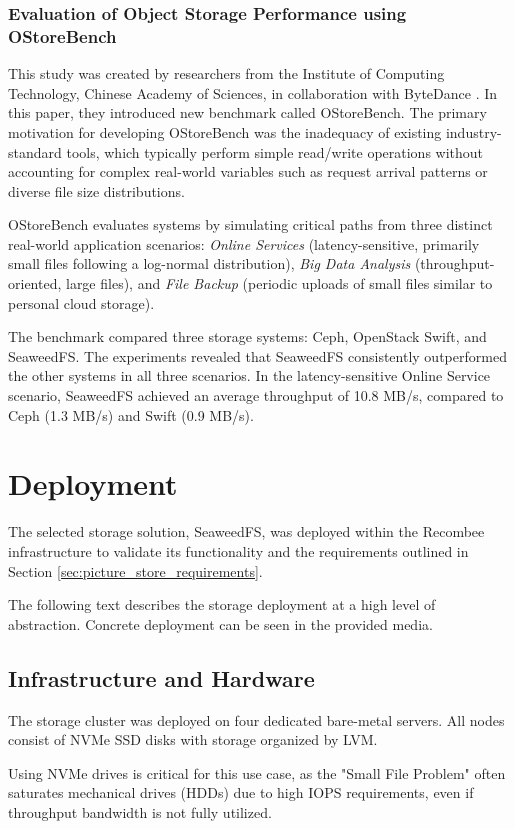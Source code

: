 \subsubsection*{Evaluation of Object Storage Performance using OStoreBench}
This study was created by researchers from the Institute of Computing Technology, Chinese Academy of Sciences, in collaboration with ByteDance \cite{kang_ostorebench_2020}. In this paper, they introduced new benchmark called OStoreBench. The primary motivation for developing OStoreBench was the inadequacy of existing industry-standard tools, which typically perform simple read/write operations without accounting for complex real-world variables such as request arrival patterns or diverse file size distributions.

OStoreBench evaluates systems by simulating critical paths from three distinct real-world application scenarios: \textit{Online Services} (latency-sensitive, primarily small files following a log-normal distribution), \textit{Big Data Analysis} (throughput-oriented, large files), and \textit{File Backup} (periodic uploads of small files similar to personal cloud storage).\cite{kang_ostorebench_2020}

The benchmark compared three storage systems: Ceph, OpenStack Swift, and SeaweedFS. The experiments revealed that SeaweedFS consistently outperformed the other systems in all three scenarios. In the latency-sensitive Online Service scenario, SeaweedFS achieved an average throughput of 10.8 MB/s, compared to Ceph (1.3 MB/s) and Swift (0.9 MB/s).\cite{kang_ostorebench_2020}

\section{Deployment}
The selected storage solution, SeaweedFS, was deployed within the Recombee infrastructure to validate its functionality and the requirements outlined in Section \ref{sec:picture_store_requirements}. 

The following text describes the storage deployment at a high level of abstraction. Concrete deployment can be seen in the provided media.
\subsection{Infrastructure and Hardware}
The storage cluster was deployed on four dedicated bare-metal servers. All nodes consist of NVMe SSD disks with storage organized by LVM.

Using NVMe drives is critical for this use case, as the "Small File Problem" often saturates mechanical drives (HDDs) due to high IOPS requirements, even if throughput bandwidth is not fully utilized.
